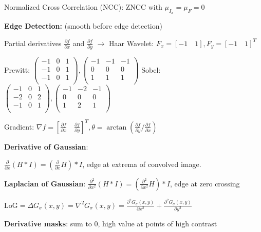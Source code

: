 \documentclass[fontsize=6pt]{scrartcl}
\begin{document}
\begin{multicols*}{4}
Normalized Cross Correlation (NCC): ZNCC with $\mu_{I_x} = \mu_F = 0$

\textbf{Edge Detection:} (smooth before edge detection)

Partial derivatives $\frac{\partial f}{\partial x}$ and $\frac{\partial f}{\partial y}$ $\rightarrow$ Haar Wavelet: $F_x = [-1\quad 1], F_y= [-1\quad 1]^T$

Prewitt:
$
\left(
\begin{smallmatrix}
-1 & 0 & 1\\
-1 & 0 & 1\\
-1 & 0 & 1\\
\end{smallmatrix}
\right)
,
\left(
\begin{smallmatrix}
-1 & -1 & -1\\
0 & 0 & 0\\
1 & 1 & 1\\
\end{smallmatrix}
\right)
$
Sobel: 
$
\left(
\begin{smallmatrix}
	-1 & 0 & 1\\
	-2 & 0 & 2\\
	-1 & 0 & 1\\
\end{smallmatrix}
\right)
,
\left(
\begin{smallmatrix}
-1 & -2 & -1\\
0 & 0 & 0\\
1 & 2 & 1\\
\end{smallmatrix}
\right)
$

Gradient: $\nabla f = [\frac{\partial f}{\partial x}\quad \frac{\partial f}{\partial y}]^T, \theta = \arctan(\frac{\partial f}{\partial y}/\frac{\partial f}{\partial x})$

\textbf{Derivative of Gaussian}:

$\frac{\partial}{\partial x} ( H \ast I) = \left(\frac{\partial}{\partial x} H\right) \ast I$, edge at extrema of convolved image.

\textbf{Laplacian of Gaussian}: 
$\frac{\partial^2}{\partial x^2} ( H \ast I) = \left(\frac{\partial^2}{\partial x^2} H\right) \ast I$, edge at zero crossing

$\mathrm{LoG} = \Delta G_\sigma(x, y) = \nabla^2 G_\sigma(x, y) = \frac{\partial^2 G_\sigma(x,y)}{\partial x^2} + \frac{\partial^2 G_\sigma(x, y)}{\partial y^2}$

\textbf{Derivative masks}: sum to 0, high value at points of high contrast


\end{multicols*}
\end{document}

